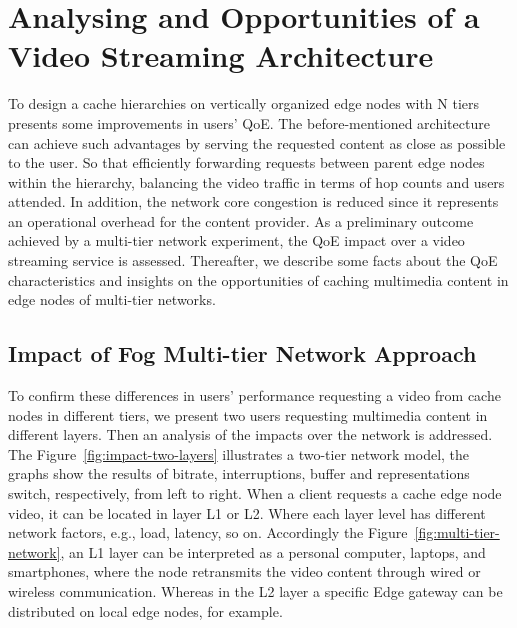 \section{Analysing and Opportunities of a Video Streaming Architecture}
\label{sec:system-archi}


To design a cache hierarchies on vertically organized edge nodes with N tiers presents some improvements in users' QoE. The before-mentioned architecture can achieve such advantages by serving the requested content as close as possible to the user. So that efficiently forwarding requests between parent edge nodes within the hierarchy, balancing the video traffic in terms of hop counts and users attended. In addition, the network core congestion is reduced since it represents an operational overhead for the content provider.
As a preliminary outcome achieved by a multi-tier network experiment, the QoE impact over a video streaming service is assessed. Thereafter, we describe some facts about the QoE characteristics and insights on the opportunities of caching multimedia content in edge nodes of multi-tier networks.

\subsection{Impact of Fog Multi-tier Network Approach}

To confirm these differences in users' performance requesting a video from cache nodes in different tiers, we present two users requesting multimedia content in different layers. Then an analysis of the impacts over the network is addressed. The Figure~\ref{fig:impact-two-layers} illustrates a two-tier network model, the graphs show the results of bitrate, interruptions, buffer and representations switch, respectively, from left to right.%
When a client requests a cache edge node video, it can be located in layer L1 or L2. Where each layer level has different network factors, e.g., load, latency, so on. Accordingly the Figure~\ref{fig:multi-tier-network}, an L1 layer can be interpreted as a personal computer, laptops, and smartphones, where the node retransmits the video content through wired or wireless communication. Whereas in the L2 layer a specific Edge gateway can be distributed on local edge nodes, for example.

